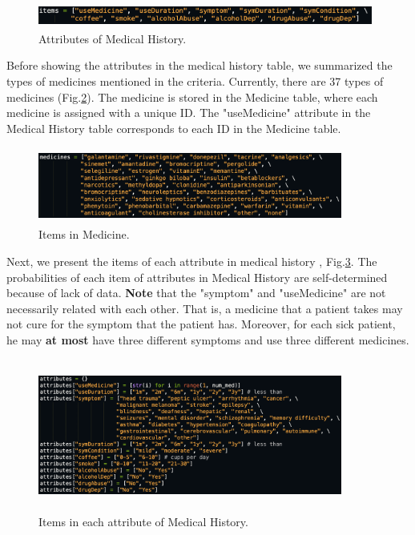 \documentclass{article}
\begin{document}
\begin{figure}[!hbt]
\centering
\includegraphics[width=11cm, height=0.8cm]{figs/medhist_attr.png}
\caption{Attributes of Medical History.}
\label{f:medhist_attr}
\end{figure}

\noindent Before showing the attributes in the medical history table, we summarized the types of medicines mentioned in the criteria. Currently, there are 37 types of medicines (Fig.\ref{f:medicine}). The medicine is stored in the Medicine table, where each medicine is assigned with a unique ID. The "useMedicine" attribute in the Medical History table corresponds to each ID in the Medicine table.

\begin{figure}[!hbt]
\centering
\includegraphics[width=10cm, height=2.5cm]{figs/medicine.png}
\caption{Items in Medicine.}
\label{f:medicine}
\end{figure}

\newpage
\noindent Next, we present the items of each attribute in medical history , Fig.\ref{f:medhistory}. The probabilities of each item of attributes in Medical History are self-determined because of lack of data. \textbf{Note} that the "symptom" and "useMedicine" are not necessarily related with each other. That is, a medicine that a patient takes may not cure for the symptom that the patient has. Moreover, for each sick patient, he may \textbf{at most} have three different symptoms and use three different medicines.

\begin{figure}[!hbt]
\centering
\includegraphics[width=10cm, height=5cm]{figs/medhistory.png}
\caption{Items in each attribute of Medical History.}
\label{f:medhistory}
\end{figure}
\end{document}

